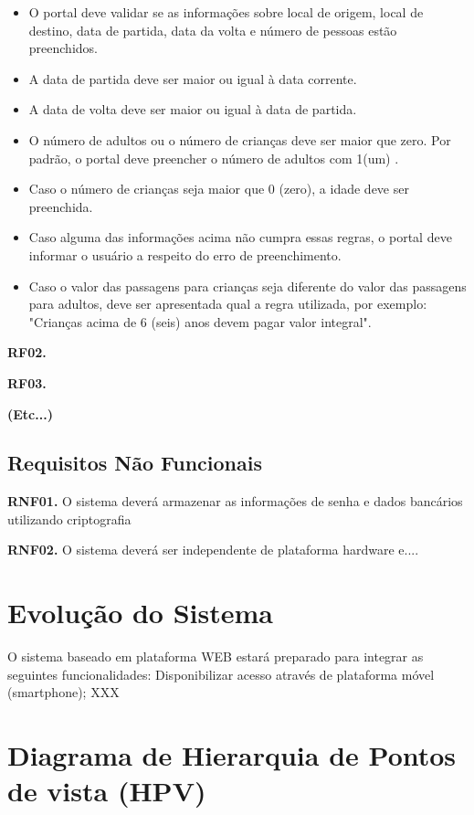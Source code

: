 \documentclass[12pt,a4paper]{article}
\begin{document}
\begin{itemize}

\item O portal deve validar se as informações sobre local de origem, local de destino, data de partida, data da volta e número de pessoas estão preenchidos.
\item A data de partida deve ser maior ou igual à data corrente.
\item A data de volta deve ser maior ou igual à data de partida.
\newpage
\item O número de adultos ou o número de crianças deve ser maior que zero. Por padrão, o portal deve preencher o número de adultos com 1(um) .
\item Caso o número de crianças seja maior que 0 (zero), a idade deve ser preenchida.
\item Caso alguma das informações acima não cumpra essas regras, o portal deve informar o usuário a respeito do erro de preenchimento. 
\item Caso o valor das passagens para crianças seja diferente do valor das passagens para adultos, deve ser apresentada qual a regra utilizada, por exemplo: "Crianças acima de 6 (seis) anos devem pagar valor integral".

\end{itemize}

\textbf{RF02. }

\textbf{RF03.} 

\textbf{(Etc...)}

 


\subsection{Requisitos Não Funcionais}

\textbf{RNF01.} O sistema deverá armazenar as informações de senha e dados bancários utilizando criptografia

\textbf{RNF02.} O sistema deverá ser independente de plataforma hardware e....

\section{Evolução do Sistema}

O sistema baseado em plataforma WEB estará preparado para integrar as seguintes funcionalidades:
Disponibilizar acesso através de plataforma móvel (smartphone);
XXX



\section{Diagrama de Hierarquia de Pontos de vista (HPV)}
\end{document}
